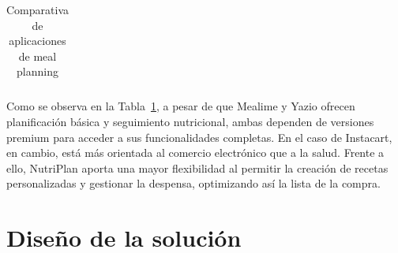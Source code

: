 \documentclass[12pt,a4paper]{report} %
\begin{document}
\begin{table}[H]
\begin{tabular}{|p{3cm}|p{5cm}|p{5cm}|}
		\end{tabular}			
		\caption{Comparativa de aplicaciones de meal planning}
		\label{tab:comparativa_apps}
	\end{table}
	
	Como se observa en la Tabla~\ref{tab:comparativa_apps}, a pesar de que Mealime y Yazio ofrecen planificación básica y seguimiento nutricional, ambas dependen de versiones premium para acceder a sus funcionalidades completas. En el caso de Instacart, en cambio, está más orientada al comercio electrónico que a la salud. Frente a ello, NutriPlan aporta una mayor flexibilidad al permitir la creación de recetas personalizadas y gestionar la despensa, optimizando así la lista de la compra.
	\\
	
	\section*{Diseño de la solución}
	
	
	
	
	
	
\end{document}
